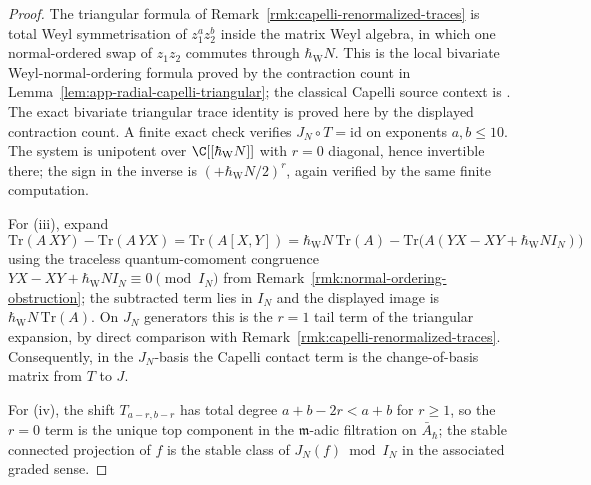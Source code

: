 \documentclass[11pt]{memoir}
\begin{document}
\begin{proof}
  The triangular formula of
  Remark~\ref{rmk:capelli-renormalized-traces} is total Weyl symmetrisation
  of $z_1^az_2^b$ inside the matrix Weyl algebra, in which one
  normal-ordered swap of $z_1z_2$ commutes through
  $\hbar_{\mathrm{W}}N$. This is
  the local bivariate Weyl-normal-ordering formula proved by the
  contraction count in
  Lemma~\ref{lem:app-radial-capelli-triangular}; the classical
  Capelli source context is \cite{capelli}\cite{howe-capelli}.  The exact
  bivariate triangular trace identity is proved here by the displayed
  contraction count.  A finite exact check verifies
  \(J_N\circ T=\mathrm{id}\) on exponents \(a,b\leq10\).
  The system is unipotent over $\C[[\hbar_{\mathrm{W}}N]]$ with
  $r=0$ diagonal, hence invertible there; the sign in the inverse is
  $(+\hbar_{\mathrm{W}}N/2)^r$, again
  verified by the same finite computation.

  For (iii), expand
  $$\mathrm{Tr}(A\,XY)-\mathrm{Tr}(A\,YX)
    =\mathrm{Tr}(A[X,Y])
    =\hbar_{\mathrm{W}}N\,\mathrm{Tr}(A)
      -\mathrm{Tr}\bigl(A(YX-XY+\hbar_{\mathrm{W}}N I_N)\bigr)$$
  using the traceless quantum-comoment congruence
  \(YX-XY+\hbar_{\mathrm{W}}N I_N\equiv0\pmod{I_N}\) from
  Remark~\ref{rmk:normal-ordering-obstruction}; the subtracted term lies
  in $I_N$ and the displayed image is
  $\hbar_{\mathrm{W}}N\,\mathrm{Tr}(A)$. On $J_N$
  generators this is the $r=1$ tail term of the triangular expansion, by
  direct comparison with Remark~\ref{rmk:capelli-renormalized-traces}.
  Consequently, in the $J_N$-basis the Capelli contact term is the
  change-of-basis matrix from $T$ to $J$.

  For (iv), the shift $T_{a-r,b-r}$ has total degree $a+b-2r<a+b$ for
  $r\geq 1$, so the $r=0$ term is the unique top component in the
  $\mathfrak m$-adic filtration on $\bar A_\hbar$; the stable connected
  projection of \(f\) is the stable class of \(J_N(f)\bmod I_N\) in the
  associated graded sense.
\end{proof}
\end{document}
